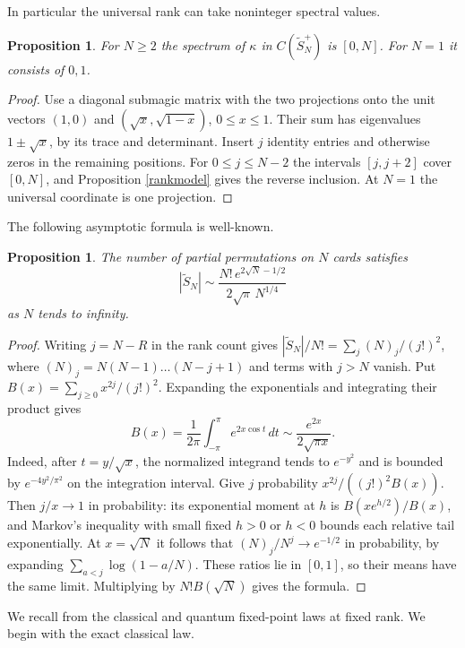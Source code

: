 \documentclass[11pt,a4paper]{article}
\newtheorem{prop}[thm]{Proposition}
\begin{document}
In particular the universal rank can take noninteger spectral values.

\begin{prop}
For $N\geq2$ the spectrum of $\kappa$ in $C(\widetilde S_N^+)$ is $[0,N]$. For $N=1$ it consists of $0,1$.
\end{prop}
\begin{proof}
Use a diagonal submagic matrix with the two projections onto the unit vectors $(1,0)$ and $(\sqrt x,\sqrt{1-x})$, $0\leq x\leq1$. Their sum has eigenvalues $1\pm\sqrt x$, by its trace and determinant. Insert $j$ identity entries and otherwise zeros in the remaining positions. For $0\leq j\leq N-2$ the intervals $[j,j+2]$ cover $[0,N]$, and Proposition \ref{rankmodel} gives the reverse inclusion. At $N=1$ the universal coordinate is one projection.
\end{proof}

The following asymptotic formula is well-known.

\begin{prop}
The number of partial permutations on $N$ cards satisfies
\[
 |\widetilde S_N|\sim \frac{N!\,e^{2\sqrt N-1/2}}{2\sqrt{\pi}\,N^{1/4}}
\]
as $N$ tends to infinity.
\end{prop}
\begin{proof}
Writing $j=N-R$ in the rank count gives $|\widetilde S_N|/N!=\sum_j (N)_j/(j!)^2$, where $(N)_j=N(N-1)\ldots(N-j+1)$ and terms with $j>N$ vanish. Put $B(x)=\sum_{j\geq0}x^{2j}/(j!)^2$. Expanding the exponentials and integrating their product gives
\[
 B(x)=\frac1{2\pi}\int_{-\pi}^{\pi}e^{2x\cos t}\,dt
 \sim \frac{e^{2x}}{2\sqrt{\pi x}}.
\]
Indeed, after $t=y/\sqrt x$, the normalized integrand tends to $e^{-y^2}$ and is bounded by $e^{-4y^2/\pi^2}$ on the integration interval. Give $j$ probability $x^{2j}/((j!)^2B(x))$. Then $j/x\to1$ in probability: its exponential moment at $h$ is $B(xe^{h/2})/B(x)$, and Markov's inequality with small fixed $h>0$ or $h<0$ bounds each relative tail exponentially. At $x=\sqrt N$ it follows that $(N)_j/N^j\to e^{-1/2}$ in probability, by expanding $\sum_{a<j}\log(1-a/N)$. These ratios lie in $[0,1]$, so their means have the same limit. Multiplying by $N!B(\sqrt N)$ gives the formula.
\end{proof}

We recall from \cite{qp} the classical and quantum fixed-point laws at fixed rank. We begin with the exact classical law.
\end{document}
